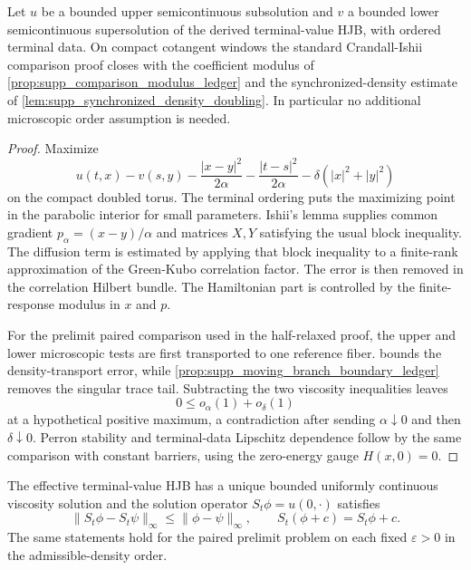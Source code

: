 \begin{proposition}
\label{prop:supp_doubled_variable_comparison}
Let \(u\) be a bounded upper semicontinuous subsolution and \(v\) a bounded
lower semicontinuous supersolution of the derived terminal-value HJB, with
ordered terminal data.  On compact cotangent windows the standard
Crandall-Ishii comparison proof closes with the coefficient modulus of
\cref{prop:supp_comparison_modulus_ledger} and the synchronized-density
estimate of \cref{lem:supp_synchronized_density_doubling}.  In particular no
additional microscopic order assumption is needed.
\end{proposition}

\begin{proof}
Maximize
\[
  u(t,x)-v(s,y)-\frac{|x-y|^2}{2\alpha}
  -\frac{|t-s|^2}{2\alpha}-\delta(|x|^2+|y|^2)
\]
on the compact doubled torus.  The terminal ordering puts the maximizing point
in the parabolic interior for small parameters.  Ishii's lemma supplies common
gradient \(p_\alpha=(x-y)/\alpha\) and matrices \(X,Y\) satisfying the usual
block inequality.  The diffusion term is estimated by applying that block
inequality to a finite-rank approximation of the Green-Kubo correlation
factor.  The error is then removed in the correlation Hilbert bundle.  The
Hamiltonian part is controlled by the finite-response modulus in \(x\) and
\(p\).

For the prelimit paired comparison used in the half-relaxed proof, the upper
and lower microscopic tests are first transported to one reference fiber.
 bounds the density-transport
error, while \cref{prop:supp_moving_branch_boundary_ledger} removes the
singular trace tail.  Subtracting the two viscosity inequalities leaves
\[
  0\le o_\alpha(1)+o_\delta(1)
\]
at a hypothetical positive maximum, a contradiction after sending
\(\alpha\downarrow0\) and then \(\delta\downarrow0\).  Perron stability and
terminal-data Lipschitz dependence follow by the same comparison with constant
barriers, using the zero-energy gauge \(H(x,0)=0\).
\end{proof}

\begin{proposition}
\label{prop:supp_terminal_stability}
The effective terminal-value HJB has a unique bounded uniformly continuous
viscosity solution and the solution operator \(S_t\phi=u(0,\cdot)\) satisfies
\[
  \|S_t\phi-S_t\psi\|_\infty\le \|\phi-\psi\|_\infty,\qquad
  S_t(\phi+c)=S_t\phi+c .
\]
The same statements hold for the paired prelimit problem on each fixed
\(\varepsilon>0\) in the admissible-density order.
\end{proposition}

